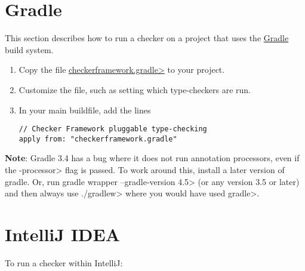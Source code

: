 \section{Gradle\label{gradle}}

This section describes how to run a checker
on a project that uses the \href{https://gradle.org/}{Gradle} build system.

\begin{enumerate}
\item
  Copy the file
  \href{https://raw.githubusercontent.com/typetools/checker-framework/master/docs/manual/checkerframework.gradle}{\<checkerframework.gradle>}
  to your project.

\item
  Customize the file, such as setting which type-checkers are run.

\item
  In your main buildfile, add the lines
\begin{Verbatim}
// Checker Framework pluggable type-checking
apply from: "checkerframework.gradle"
\end{Verbatim}

\end{enumerate}


\textbf{Note}: Gradle 3.4 has a bug where it does not run annotation processors,
even if the \<-processor> flag is passed.
To work around this, install a later version of gradle.  Or, run
\<gradle wrapper --gradle-version 4.5> (or any version 3.5 or later) and
then always use \<./gradlew> where you would have used \<gradle>.




\section{IntelliJ IDEA\label{intellij}}


To run a checker within IntelliJ:

